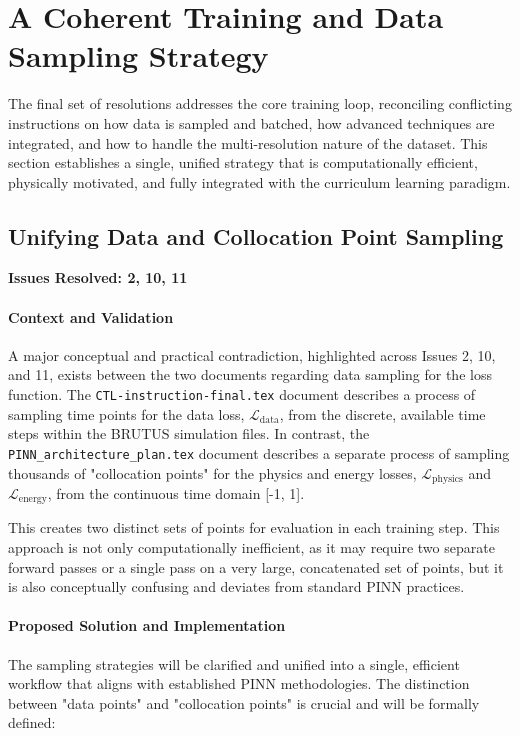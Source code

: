 \section{A Coherent Training and Data Sampling Strategy}
The final set of resolutions addresses the core training loop, reconciling conflicting instructions on how data is sampled and batched, how advanced techniques are integrated, and how to handle the multi-resolution nature of the dataset. This section establishes a single, unified strategy that is computationally efficient, physically motivated, and fully integrated with the curriculum learning paradigm.

\subsection{Unifying Data and Collocation Point Sampling}
\textbf{Issues Resolved: 2, 10, 11}
\paragraph{Context and Validation}
A major conceptual and practical contradiction, highlighted across Issues 2, 10, and 11, exists between the two documents regarding data sampling for the loss function. The \texttt{CTL-instruction-final.tex} document describes a process of sampling time points for the data loss, $\mathcal{L}_{\text{data}}$, from the discrete, available time steps within the BRUTUS simulation files. In contrast, the \texttt{PINN\_architecture\_plan.tex} document describes a separate process of sampling thousands of "collocation points" for the physics and energy losses, $\mathcal{L}_{\text{physics}}$ and $\mathcal{L}_{\text{energy}}$, from the continuous time domain [-1, 1].

This creates two distinct sets of points for evaluation in each training step. This approach is not only computationally inefficient, as it may require two separate forward passes or a single pass on a very large, concatenated set of points, but it is also conceptually confusing and deviates from standard PINN practices.

\paragraph{Proposed Solution and Implementation}
The sampling strategies will be clarified and unified into a single, efficient workflow that aligns with established PINN methodologies. The distinction between "data points" and "collocation points" is crucial and will be formally defined:


